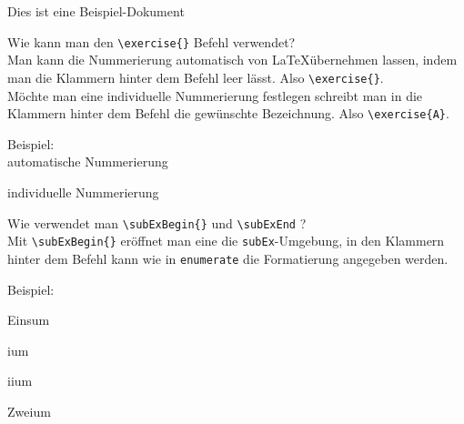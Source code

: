\documentclass{uni_tue_template}
\begin{document}
Dies ist eine Beispiel-Dokument

Wie kann man den \verb+\exercise{}+ Befehl verwendet?\\
Man kann die Nummerierung automatisch von \LaTeX\hspace{1.5mm}übernehmen lassen, indem man die Klammern hinter dem Befehl leer lässt. Also \verb+\exercise{}+.\\
Möchte man eine individuelle Nummerierung festlegen schreibt man in die Klammern hinter dem Befehl die gewünschte Bezeichnung. Also \verb+\exercise{A}+.

Beispiel:\\
\exercise{}
\exercise{}
automatische Nummerierung

individuelle Nummerierung

\vspace{10mm}
Wie verwendet man \verb+\subExBegin{}+ und \verb+\subExEnd+ ?\\
Mit \verb+\subExBegin{}+ eröffnet man eine die \verb+subEx+-Umgebung, in den Klammern hinter dem Befehl kann wie in \verb+enumerate+ die Formatierung angegeben werden.

Beispiel:
\subExBegin{}
	\item Einsum
		\item ium
		\item iium
	\subExEnd
	\item Zweium
\subExEnd
\end{document}
